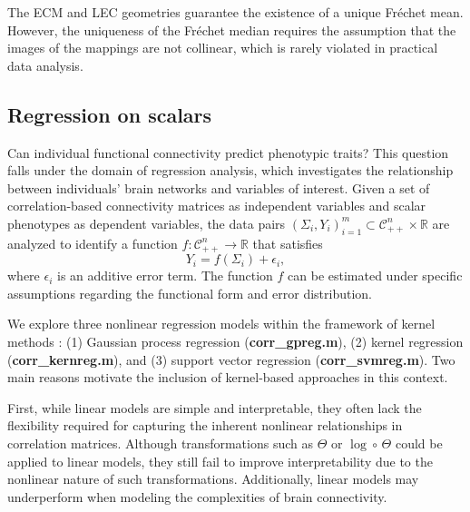 \documentclass[10pt]{article}
\newcommand{\Frechet}{Fr\'{e}chet }
\newcommand{\CORR}{\mathcal{C}_{++}^n}
\newcommand{\logTheta}{\log\circ \,\Theta}
\begin{document}
The ECM and LEC geometries guarantee the existence of a unique \Frechet mean. However, the uniqueness of the \Frechet median requires the assumption that the images of the mappings are not collinear, which is rarely violated in practical data analysis.





\subsection{Regression on scalars}



Can individual functional connectivity predict phenotypic traits? This question falls under the domain of regression analysis, which investigates the relationship between individuals' brain networks and variables of interest. Given a set of correlation-based connectivity matrices as independent variables and scalar phenotypes as dependent variables, the data pairs $(\Sigma_i, Y_i)_{i=1}^m \subset \CORR \times \mathbb{R}$ are analyzed to identify a function $f:\CORR \rightarrow \mathbb{R}$ that satisfies
\begin{equation*} 
	Y_i = f(\Sigma_i) + \epsilon_i, 
\end{equation*}
where $\epsilon_i$ is an additive error term. The function $f$ can be estimated under specific assumptions regarding the functional form and error distribution.

We explore three nonlinear regression models within the framework of kernel methods \citep{scholkopf_2002_LearningKernelsSupport}: (1) Gaussian process regression (\textbf{corr\_gpreg.m}), (2) kernel regression (\textbf{corr\_kernreg.m}), and (3) support vector regression (\textbf{corr\_svmreg.m}). Two main reasons motivate the inclusion of kernel-based approaches in this context.

First, while linear models are simple and interpretable, they often lack the flexibility required for capturing the inherent nonlinear relationships in correlation matrices. Although transformations such as $\Theta$ or $\logTheta$ could be applied to linear models, they still fail to improve interpretability due to the nonlinear nature of such transformations. Additionally, linear models may underperform when modeling the complexities of brain connectivity.
\end{document}
